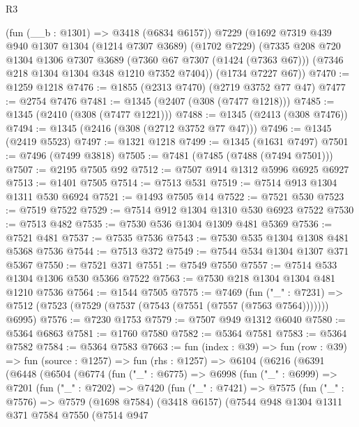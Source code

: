 \begin{lexlean}{R3}
\begin{coremodule}
    (fun (__b : @1301) => @3418 (@6834 @6157))
    @7229
    (@1692
      @7319
      @439
      @940
      @1307
      @1304
      (@1214 @7307 @3689)
      (@1702 @7229)
      (@7335
        @208
        @720
        @1304
        @1306
        @7307
        @3689
        (@7360 @67 @7307 (@1424 (@7363 @67)))
        (@7346 @218 @1304 @1304 @348 @1210 @7352 @7404))
      (@1734 @7227 @67))
@7470 := @1259 @1218
@7476 := @1855 (@2313 @7470) (@2719 @3752 @77 @47)
@7477 := @2754 @7476
@7481 := @1345 (@2407 (@308 (@7477 @1218)))
@7485 := @1345 (@2410 (@308 (@7477 @1221)))
@7488 := @1345 (@2413 (@308 @7476))
@7494 := @1345 (@2416 (@308 (@2712 @3752 @77 @47)))
@7496 := @1345 (@2419 @5523)
@7497 := @1321 @1218
@7499 := @1345 (@1631 @7497)
@7501 := @7496 (@7499 @3818)
@7505 := @7481 (@7485 (@7488 (@7494 @7501)))
@7507 := @2195 @7505 @92
@7512 := @7507 @914 @1312 @5996 @6925 @6927
@7513 := @1401 @7505
@7514 := @7513 @531
@7519 := @7514 @913 @1304 @1311 @530 @6924
@7521 := @1493 @7505 @14
@7522 := @7521 @530
@7523 := @7519 @7522
@7529 := @7514 @912 @1304 @1310 @530 @6923 @7522
@7530 := @7513 @482
@7535 := @7530 @536 @1304 @1309 @481 @5369
@7536 := @7521 @481
@7537 := @7535 @7536
@7543 := @7530 @535 @1304 @1308 @481 @5368 @7536
@7544 := @7513 @372
@7549 := @7544 @534 @1304 @1307 @371 @5367
@7550 := @7521 @371
@7551 := @7549 @7550
@7557 := @7514 @533 @1304 @1306 @530 @5366 @7522
@7563 := @7530 @218 @1304 @1304 @481 @1210 @7536
@7564 := @1544 @7505
@7575 := @7469
    (fun ("_" : @7231) => @7512 (@7523 (@7529 (@7537 (@7543 (@7551 (@7557 (@7563 @7564))))))) @6995)
@7576 := @7230 @1753
@7579 := @7507 @949 @1312 @6040
@7580 := @5364 @6863
@7581 := @1760 @7580
@7582 := @5364 @7581
@7583 := @5364 @7582
@7584 := @5364 @7583
@7663 := fun (index : @39) =>
  fun (row : @39) =>
  fun (source : @1257) =>
  fun (rhs : @1257) =>
  @6104
    (@6216
      (@6391
        (@6448
          (@6504
            (@6774
              (fun ("_" : @6775) =>
              @6998
                (fun ("_" : @6999) =>
                @7201
                  (fun ("_" : @7202) =>
                  @7420
                    (fun ("_" : @7421) =>
                    @7575
                      (fun ("_" : @7576) =>
                      @7579
                        (@1698 @7584)
                        (@3418 @6157)
                        (@7544
                          @948
                          @1304
                          @1311
                          @371
                          @7584
                          @7550
                          (@7514
                            @947

\end{coremodule}
\end{lexlean}
